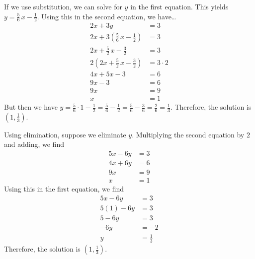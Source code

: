 \documentclass[11pt,letterpaper]{article}
\begin{document}
If we use substitution, we can solve for $y$ in the first equation. This yields $y= \frac{5}{6}\,x - \frac{1}{2}$. Using this in the second equation, we have\dots
	\[
	\begin{aligned}
	2x + 3y&= 3 \\
	2x + 3 \left( \frac{5}{6}\,x - \frac{1}{2} \right)&= 3 \\
	2x + \frac{5}{2}\,x - \frac{3}{2}&= 3 \\
	2 \left( 2x + \frac{5}{2}\,x - \frac{3}{2} \right)&= 3 \cdot 2 \\
	4x + 5x - 3&= 6 \\
	9x - 3&= 6 \\
	9x&= 9 \\
	x&= 1
	\end{aligned}
	\]
But then we have $y= \frac{5}{6} \cdot 1 - \frac{1}{2}= \frac{5}{6} - \frac{1}{2}= \frac{5}{6} - \frac{3}{6}= \frac{2}{6}= \frac{1}{3}$. Therefore, the solution is $(1, \frac{1}{3})$. \pspace

Using elimination, suppose we eliminate $y$. Multiplying the second equation by $2$ and adding, we find
	\[
	\begin{aligned}
	5x - 6y&= 3 \\
	4x + 6y&= 6 \\ \hline
	9x&= 9 \\
	x&= 1
	\end{aligned}
	\] 
Using this in the first equation, we find
	\[
	\begin{aligned}
	5x - 6y&= 3 \\
	5(1) - 6y&= 3 \\
	5 - 6y&= 3 \\
	-6y&= -2 \\
	y&= \frac{1}{3}
	\end{aligned}
	\]
Therefore, the solution is $(1, \frac{1}{3})$. 


\end{document}
